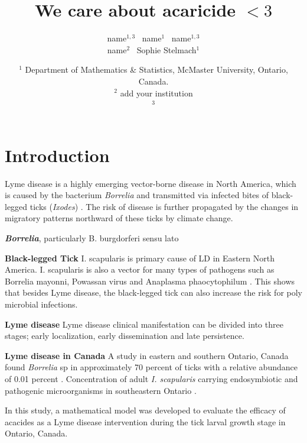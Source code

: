 \documentclass[12pt, centerh1]{article}
\title{We care about acaricide $<3$}
\author{\qquad name$^{1,3}$ \qquad\  name$^{1}$ \qquad\  name$^{1,3}$ \\  name$^{2}$ \quad\ Sophie Stelmach$^{1}$}
\date{{\small $^1$ Department of Mathematics \& Statistics, McMaster University, Ontario, Canada.\\[-6pt]
$^2$ add your institution\\[-6pt]
$^3$ \\[-6pt]
}
}
\begin{document}
\maketitle



\section{Introduction}
Lyme disease is a highly emerging vector-borne disease in North America, which is caused by the bacterium \textit{Borrelia} and transmitted via infected bites of black-legged ticks (\textit{Ixodes}) \citep{govcan}. The risk of disease is further propagated by the changes in migratory patterns northward of these ticks by climate change.

\textbf{\textit{Borrelia}}, particularly B. burgdorferi sensu lato

\textbf{Black-legged Tick}
I. scapularis is primary cause of LD in Eastern North America. I. scapularis is also a vector for many types of pathogens such as Borrelia mayonni, Powassan virus and Anaplasma phaocytophilum \citep{paulson2023multiomics}. This shows that besides Lyme disease, the black-legged tick can also increase the risk for poly microbial infections. 


\textbf{Lyme disease}
Lyme disease clinical manifestation can be divided into three stages; early localization, early dissemination and late persistence. 

\textbf{Lyme disease in Canada}
A study in eastern and southern Ontario, Canada found \textit{Borrelia} sp in approximately 70 percent of ticks with a relative abundance of 0.01 percent \citep{clow2018microbiota}. Concentration of adult \textit{I. scapularis} carrying endosymbiotic and pathogenic microorganisms in southeastern Ontario \citep{paulson2023multiomics}. 

In this study, a mathematical model was developed to evaluate the efficacy of acacides as a Lyme disease intervention during the tick larval growth stage in Ontario, Canada.
\end{document}
